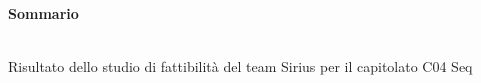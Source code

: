 \noindent\begin{Large}\textbf{Sommario}\end{Large}\\

\noindent Risultato dello studio di fattibilità del team Sirius per il capitolato C04 Seq\\